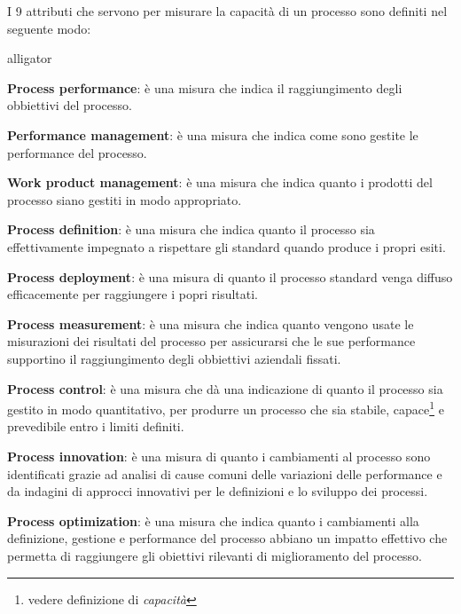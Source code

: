 I 9 attributi che servono per misurare la capacità di un processo sono definiti nel seguente modo:
\begin{labeling}{alligator}
	\item \textbf{Process performance}:  è una misura che indica il raggiungimento degli obbiettivi del processo.
	\item \textbf{Performance management}: è una misura che indica come sono gestite le performance del processo.%
	\item \textbf{Work product management}: è una misura che indica quanto i prodotti del processo siano gestiti in modo appropriato.
	\item \textbf{Process definition}: è una misura che indica quanto il processo sia effettivamente impegnato a rispettare gli standard quando produce i propri esiti.
	\item \textbf{Process deployment}: è una misura di quanto il processo standard venga diffuso efficacemente per raggiungere i popri risultati.%
	\item \textbf{Process measurement}:  è una misura che indica quanto vengono usate le misurazioni dei risultati  del processo per assicurarsi che le sue  performance supportino il raggiungimento degli obbiettivi aziendali fissati.
	\item \textbf{Process control}:  è una misura che dà una indicazione di quanto il processo sia gestito in modo quantitativo, per produrre un processo che sia stabile, capace\footnote{vedere definizione di \emph{capacità}} e prevedibile entro i limiti definiti.%
	\item \textbf{Process innovation}: è una misura di quanto i cambiamenti al processo sono identificati grazie ad analisi di cause comuni delle variazioni delle performance e da indagini di approcci innovativi per le definizioni e lo sviluppo dei processi.%
	\item \textbf{Process optimization}: è una misura che indica quanto i cambiamenti alla definizione, gestione e performance del processo abbiano un impatto effettivo che permetta di raggiungere gli obiettivi rilevanti di miglioramento del processo.%
\end{labeling}

